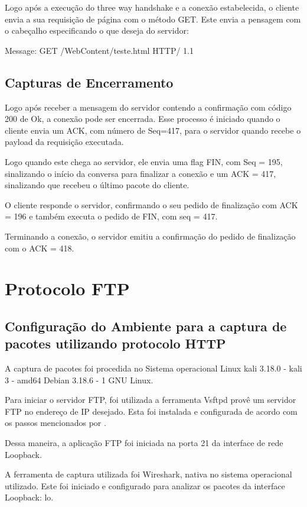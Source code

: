 Logo  após a execução do three way handshake e a conexão estabelecida, o cliente envia a sua
  requisição de página com o método GET. Este envia a pensagem com o cabeçalho especificando
  o que deseja do servidor:

Message: GET /WebContent/teste.html HTTP/ 1.1


\subsection{Capturas de Encerramento}
Logo após receber a mensagem do servidor contendo a confirmação com código 200 de Ok, a
conexão pode ser encerrada. Esse processo é iniciado quando o cliente envia um ACK, com
número de Seq=417, para o servidor quando recebe o payload da requisição executada.

Logo quando este chega ao servidor, ele envia uma flag FIN, com Seq = 195, sinalizando o
  início da conversa para finalizar a conexão e um ACK = 417, sinalizando que recebeu o
  último pacote do cliente.

O cliente responde o servidor, confirmando o seu pedido de finalização com ACK = 196 e
também executa o pedido de FIN, com seq = 417.

Terminando a conexão, o servidor emitiu a confirmação do pedido de finalização com o ACK = 418.


\section{Protocolo FTP}
\subsection{Configuração do Ambiente para a captura de pacotes utilizando protocolo HTTP}
A captura de pacotes foi procedida no Sistema operacional Linux kali 3.18.0 - kali 3 - amd64
Debian 3.18.6 - 1 GNU Linux.

Para iniciar o servidor FTP, foi utilizada a ferramenta Vsftpd \cite{vsftpd} provê um servidor FTP no
endereço de IP desejado. Esta foi instalada e configurada de acordo com os passos mencionados por
\cite{instalacaovsftpd} .

Dessa maneira, a aplicação FTP foi iniciada na porta 21 da interface de rede Loopback.

A ferramenta de captura utilizada foi Wireshark, nativa no sistema operacional utilizado. Este foi
iniciado e configurado para analizar os pacotes da interface Loopback: lo.


